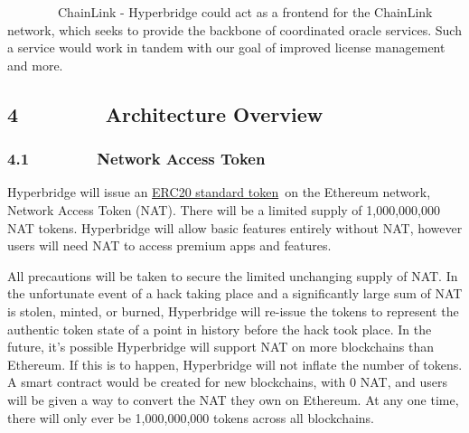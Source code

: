 \documentclass[]{article}
\begin{document}
{}

{~~~~~~~~ChainLink - Hyperbridge could act as a frontend for the
ChainLink network, which seeks to provide the backbone of coordinated
oracle services. Such a service would work in tandem with our goal of
improved license management and more.}

\hypertarget{h.jmutawro9awg}{%
\subsection{\texorpdfstring{{}}{}}\label{h.jmutawro9awg}}

\hypertarget{h.38hgs7qfpv00}{%
\subsection{\texorpdfstring{{4~~~~~~~~Architecture
Overview}}{4~~~~~~~~Architecture Overview}}\label{h.38hgs7qfpv00}}

\hypertarget{h.tje5l2r0ezdi}{%
\subsubsection{\texorpdfstring{{4.1~~~~~~~~Network Access
Token}}{4.1~~~~~~~~Network Access Token}}\label{h.tje5l2r0ezdi}}

{Hyperbridge will issue an
}{\href{https://www.google.com/url?q=https://theethereum.wiki/w/index.php/ERC20_Token_Standard\&sa=D\&ust=1512628005805000\&usg=AFQjCNEkSBD18vCiBE1Xx2cZcUh6bdS3CQ}{ERC20
standard token}}{~on the Ethereum network, Network Access Token (NAT).
There will be a limited supply of 1,000,000,000 NAT tokens. Hyperbridge
will allow basic features entirely without NAT, however users will need
NAT to access premium apps and features. }

{}

{All precautions will be taken to secure the limited unchanging supply
of NAT. In the unfortunate event of a hack taking place and a
significantly large sum of NAT is stolen, minted, or burned, Hyperbridge
will re-issue the tokens to represent the authentic token state of a
point in history before the hack took place. In the future, it's
possible Hyperbridge will support NAT on more blockchains than Ethereum.
If this is to happen, Hyperbridge will not inflate the number of tokens.
A smart contract would be created for new blockchains, with 0 NAT, and
users will be given a way to convert the NAT they own on Ethereum. At
any one time, there will only ever be 1,000,000,000 tokens across all
blockchains.}
\end{document}
